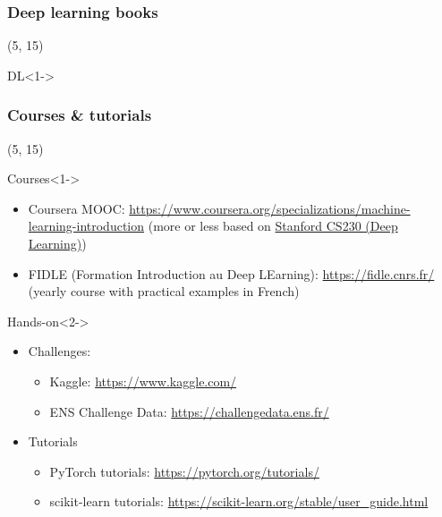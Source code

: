 \begin{frame}
  \frametitle{Deep learning books}

  \nocite{*}

  \begin{textblock}{90}(5, 15)
    \begin{block}{DL}<1->
      \printbibliography[heading=none,category=deep_learning]
    \end{block}
  \end{textblock}
\end{frame}

\begin{frame}
  \frametitle{Courses \& tutorials}

  \begin{textblock}{90}(5, 15)
    \begin{block}{Courses}<1->
      \begin{itemize}
      \item Coursera MOOC:
        \url{https://www.coursera.org/specializations/machine-learning-introduction} (more or less based on \href{https://cs230.stanford.edu/}{Stanford CS230 (Deep Learning)})
      \item FIDLE (Formation Introduction au Deep LEarning): \url{https://fidle.cnrs.fr/}
        (yearly course with practical examples in French)
      \end{itemize}
    \end{block}

    \begin{block}{Hands-on}<2->
      \begin{itemize}
      \item Challenges:
        \begin{itemize}
        \item Kaggle: \url{https://www.kaggle.com/}
        \item ENS Challenge Data: \url{https://challengedata.ens.fr/}
        \end{itemize}
      \item Tutorials
        \begin{itemize}
        \item PyTorch tutorials: \url{https://pytorch.org/tutorials/}
        \item scikit-learn tutorials:
          \url{https://scikit-learn.org/stable/user_guide.html}
        \end{itemize}
      \end{itemize}
    \end{block}
  \end{textblock}
\end{frame}


